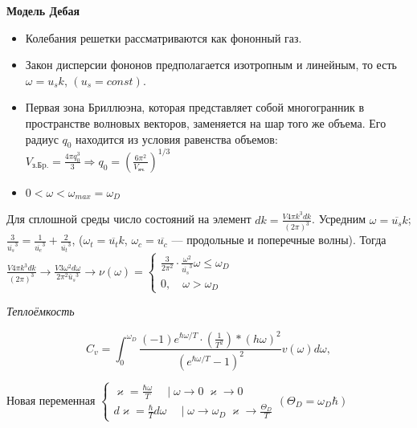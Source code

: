 \textbf{Модель Дебая}

\begin{itemize}
    \item Колебания решетки рассматриваются как фононный газ.
    \item Закон дисперсии фононов предполагается изотропным и линейным, то есть $\omega = u_{s}k$, $(u_s=const)$.
    \item Первая зона Бриллюэна, которая представляет собой многогранник в пространстве волновых векторов, заменяется на шар того же объема. Его радиус $q_0$ находится из условия равенства объемов: $V_{\text{з.Бp.}}=\frac{4 \pi q_0^3}{3} \Rightarrow q_0=\left(\frac{6 \pi^2}{V_{\text {яч. }}}\right)^{1 / 3}$
    \item $0<\omega<\omega_{max}=\omega_D$
\end{itemize}

Для сплошной среды число состояний на элемент $dk=\frac{V 4 \pi k^3 d k}{(2 \pi)^3}$. Усредним $\omega=\overline{u_s}k$; $\frac{3}{\overline{u_{s}}^3} = \frac{1}{\overline{u_{e}}^3}+\frac{2}{\overline{u_{t}}^3}$, ($\omega_t=\overline{u_t}k$, $\omega_c=\overline{u_c}$ --- продольные и поперечные волны).
Тогда $\displaystyle \frac{V 4 \pi k^3 d k}{(2 \pi)^3} \rightarrow \frac{V 3 \omega^2 d \omega}{2 \pi^2 \bar{u}_s{ }^3} \rightarrow \nu(\omega)=\left\{\begin{array}{c}\frac{3}{2 \pi^2} \cdot \frac{\omega^2}{\overline{u_s}^3} \omega \leqslant \omega_D \\ 0, \quad \omega>\omega_D\end{array}\right.$

\textit{Теплоёмкость}

\begin{equation}
    C_v=\int_0^{\omega_D} \frac{(-1)  e^{\hbar \omega / T} \cdot \left(\frac{1}{T^2}\right) *(h \omega)^2}{\left(e^{\hbar \omega / T}-1\right)^2} v(\omega) d \omega,
\end{equation}

Новая переменная $\displaystyle \left\{\begin{array}{c}\varkappa=\frac{\hbar \omega}{T} \quad \mid \omega \rightarrow 0 \; \varkappa \rightarrow 0 \\ d \varkappa=\frac{\hbar}{T} d \omega \quad \mid \omega \rightarrow \omega_D \; \varkappa \rightarrow \frac{\Theta_D}{T}\end{array}\left(\Theta_D=\omega_D \hbar\right)\right.$

